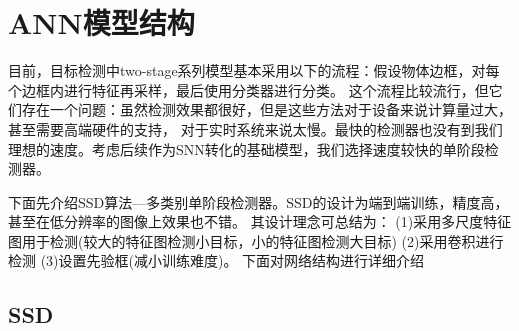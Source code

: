\chapter{ANN模型结构}
\par
目前，目标检测中two-stage系列模型基本采用以下的流程：假设物体边框，对每个边框内进行特征再采样，最后使用分类器进行分类。
这个流程比较流行，但它们存在一个问题：虽然检测效果都很好，但是这些方法对于设备来说计算量过大，甚至需要高端硬件的支持，
对于实时系统来说太慢。最快的检测器也没有到我们理想的速度。考虑后续作为SNN转化的基础模型，我们选择速度较快的单阶段检测器。
\par
下面先介绍SSD算法---多类别单阶段检测器。SSD的设计为端到端训练，精度高，甚至在低分辨率的图像上效果也不错。
其设计理念可总结为：
(1)采用多尺度特征图用于检测(较大的特征图检测小目标，小的特征图检测大目标)
(2)采用卷积进行检测
(3)设置先验框(减小训练难度)。
下面对网络结构进行详细介绍
\section{SSD}
